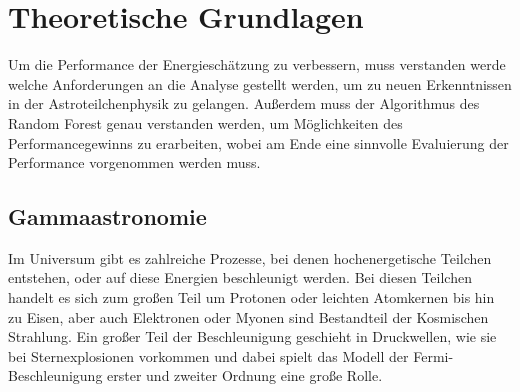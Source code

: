 \chapter{Theoretische Grundlagen}

Um die Performance der Energieschätzung zu verbessern, muss verstanden werde welche Anforderungen an die Analyse gestellt
werden, um zu neuen Erkenntnissen in der Astroteilchenphysik zu gelangen.
Außerdem muss der Algorithmus des Random Forest genau verstanden werden, um Möglichkeiten des Performancegewinns zu erarbeiten,
wobei am Ende eine sinnvolle Evaluierung der Performance vorgenommen werden muss.

\section{Gammaastronomie}
\label{sec:Gammaastronomie}

Im Universum gibt es zahlreiche Prozesse, bei denen hochenergetische Teilchen entstehen, oder auf diese Energien beschleunigt werden.
Bei diesen Teilchen handelt es sich zum großen Teil um Protonen oder leichten  Atomkernen bis hin zu Eisen, aber auch Elektronen oder Myonen
sind Bestandteil der Kosmischen Strahlung.
Ein großer Teil der Beschleunigung geschieht in Druckwellen, wie sie bei Sternexplosionen vorkommen und dabei spielt das Modell der
Fermi-Beschleunigung erster und zweiter Ordnung eine große Rolle.
%

